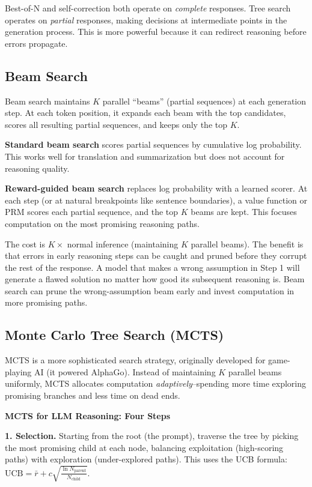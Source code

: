 \begin{chapterenv}
Best-of-N and self-correction both operate on \textit{complete} responses. Tree search operates on \textit{partial} responses, making decisions at intermediate points in the generation process. This is more powerful because it can redirect reasoning before errors propagate.

\subsection{Beam Search}

Beam search maintains $K$ parallel ``beams'' (partial sequences) at each generation step. At each token position, it expands each beam with the top candidates, scores all resulting partial sequences, and keeps only the top $K$.

\textbf{Standard beam search} scores partial sequences by cumulative log probability. This works well for translation and summarization but does not account for reasoning quality.

\textbf{Reward-guided beam search} replaces log probability with a learned scorer. At each step (or at natural breakpoints like sentence boundaries), a value function or PRM scores each partial sequence, and the top $K$ beams are kept. This focuses computation on the most promising reasoning paths.

The cost is $K \times$ normal inference (maintaining $K$ parallel beams). The benefit is that errors in early reasoning steps can be caught and pruned before they corrupt the rest of the response. A model that makes a wrong assumption in Step 1 will generate a flawed solution no matter how good its subsequent reasoning is. Beam search can prune the wrong-assumption beam early and invest computation in more promising paths.

\subsection{Monte Carlo Tree Search (MCTS)}

MCTS is a more sophisticated search strategy, originally developed for game-playing AI (it powered AlphaGo). Instead of maintaining $K$ parallel beams uniformly, MCTS allocates computation \textit{adaptively}--spending more time exploring promising branches and less time on dead ends.

\begin{infobox}
\textbf{MCTS for LLM Reasoning: Four Steps}

\textbf{1. Selection.} Starting from the root (the prompt), traverse the tree by picking the most promising child at each node, balancing exploitation (high-scoring paths) with exploration (under-explored paths). This uses the UCB formula: $\text{UCB} = \bar{r} + c\sqrt{\frac{\ln N_{\text{parent}}}{N_{\text{child}}}}$.


\end{infobox}
\end{chapterenv}
